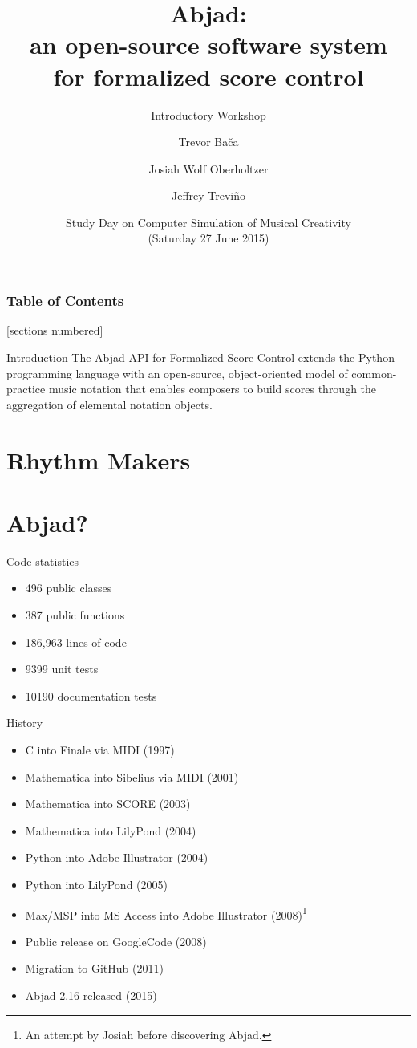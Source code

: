 \documentclass[10pt]{beamer}
\title{
    Abjad:\protect\\ 
    an open-source software system\protect\\ 
    for formalized score control
}
\subtitle{Introductory Workshop}
\author{
    Trevor Ba\v{c}a \inst{1} \and 
    Josiah Wolf Oberholtzer \inst{1} \and 
    Jeffrey Trevi\~{n}o \inst{2}
}
\institute[shortinst]{
    \inst{1}Department of Music, Harvard University \and 
    \inst{2} Department of Music, Colorado College
}
\date[CFP 2003]{
    Study Day on Computer Simulation of Musical Creativity\protect\\ 
    (Saturday 27 June 2015)
}
\begin{document}
\maketitle

\begin{frame}
    \frametitle{Table of Contents}
    [sections numbered]
    \tableofcontents[hideallsubsections]
\end{frame}

\begin{frame}{Introduction}
The Abjad API for Formalized Score Control extends the Python programming
language with an open-source, object-oriented model of common-practice music
notation that enables composers to build scores through the aggregation of
elemental notation objects.
\end{frame}

\section{Rhythm Makers}

\section{Abjad?}

\begin{frame}{Code statistics}
    \begin{itemize}
        \item 496 public classes
        \item 387 public functions
        \item 186,963 lines of code
        \item 9399 unit tests
        \item 10190 documentation tests
    \end{itemize}
\end{frame}

\begin{frame}{History}
    \begin{itemize}
        \item C into Finale via MIDI (1997)
        \item Mathematica into Sibelius via MIDI (2001)
        \item Mathematica into SCORE (2003)
        \item Mathematica into LilyPond (2004)
        \item Python into Adobe Illustrator (2004)
        \item Python into LilyPond (2005)
        \item Max/MSP into MS Access into Adobe Illustrator (2008)\footnote{
            An attempt by Josiah before discovering Abjad.
            } 
        \item Public release on GoogleCode (2008)
        \item Migration to GitHub (2011)
        \item Abjad 2.16 released (2015)
    \end{itemize}
\end{frame}
\end{document}

